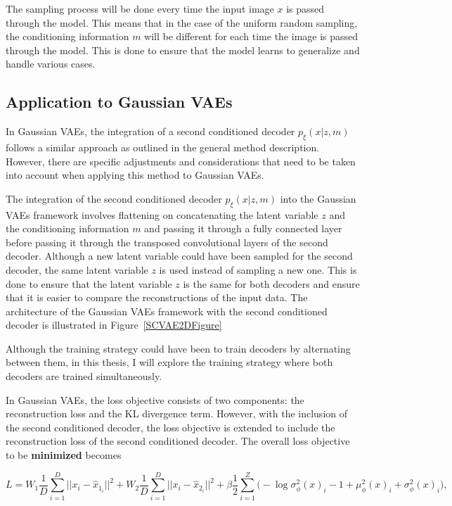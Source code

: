 The sampling process will be done every time the input image $x$ is passed through the model. This means that in the case of the uniform random sampling, the conditioning information $m$ will be different for each time the image is passed through the model. This is done to ensure that the model learns to generalize and handle various cases.

\subsection{Application to Gaussian VAEs}

In Gaussian VAEs, the integration of a second conditioned decoder
$p_\xi(x|z,m)$ follows a similar approach as outlined in the general method
description. However, there are specific adjustments and considerations that
need to be taken into account when applying this method to Gaussian VAEs.

The integration of the second conditioned decoder $p_\xi(x|z,m)$ into the
Gaussian VAEs framework involves flattening on concatenating the latent
variable $z$ and the conditioning information $m$ and passing it through a
fully connected layer before passing it through the transposed convolutional
layers of the second decoder. Although a new latent variable could have
been sampled for the second decoder, the same latent variable $z$ is used
instead of sampling a new one. This is done to ensure that the latent variable
$z$ is the same for both decoders and ensure that it is easier to compare the
reconstructions of the input data. The architecture of the Gaussian
VAEs framework with the second conditioned decoder is illustrated in
Figure~\ref{SCVAE2DFigure}

Although the training strategy could have been to train decoders by alternating between them, in this thesis, I will explore the training strategy where both decoders are trained simultaneously.

In Gaussian VAEs, the loss objective consists of two components: the
reconstruction loss and the KL divergence term. However, with the inclusion of
the second conditioned decoder, the loss objective is extended to include the
reconstruction loss of the second conditioned decoder. The overall loss
objective to be \textbf{minimized} becomes

\[ L = W_1 \frac{1}{D} \sum_{i=1}^{D} ||x_i - \hat{x}_{1_{i}} ||^2 + W_2 \frac{1}{D} \sum_{i=1}^{D} || x_i - \hat{x}_{2_{i}} ||^2 + \beta  \frac{1}{2} \sum_{i=1}^{Z} \biggl( -\log \sigma^2_\phi(x)_i - 1 + \mu^2_\phi(x)_i + \sigma^2_\phi(x)_i \biggr), \]

